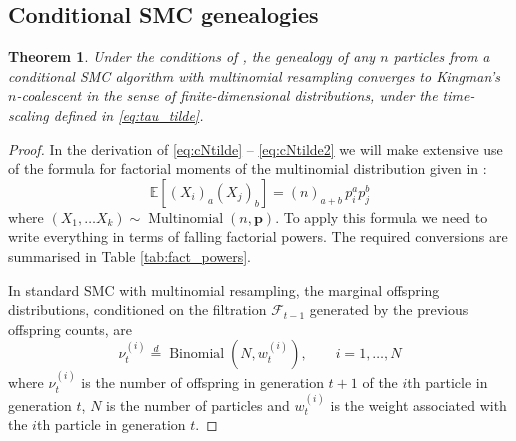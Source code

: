 \documentclass[fleqn]{article}
\newtheorem{thm}{Theorem}
\theoremstyle{definition}
\newcommand{\E}{\mathbb{E}}
\newcommand{\eqdist}{\overset{d}{=}}
\newcommand{\Mn}{\operatorname{Multinomial}}
\newcommand{\Bin}{\operatorname{Binomial}}
\newcommand{\F}{\mathcal{F}_{t-1}}
\newcommand{\vt}[2][t]{\nu_{#1}^{(#2)}}
\newcommand{\wt}[2][t]{w_{#1}^{(#2)}}
\begin{document}
\subsection{Conditional SMC genealogies}
\begin{thm}
Under the conditions of \citet[Lemma 3]{koskela2018}, the genealogy of any $n$ particles from a conditional SMC algorithm with multinomial resampling converges to Kingman's $n$-coalescent in the sense of finite-dimensional distributions, under the time-scaling defined in \eqref{eq:tau_tilde}.
\end{thm}

\begin{proof}
In the derivation of \eqref{eq:cNtilde} -- \eqref{eq:cNtilde2} we will make extensive use of the formula for factorial moments of the multinomial distribution given in \citet[p.67]{mosimann1962}:
\begin{equation} \label{eq:mn_moments}
\E[(X_i)_a(X_j)_b] = (n)_{a+b}\, p_i^a p_j^b
\end{equation}
where $(X_1,\dots X_k) \sim \Mn(n, \mathbf{p})$.
To apply this formula we need to write everything in terms of falling factorial powers. The required conversions are summarised in Table \ref{tab:fact_powers}.

In standard SMC with multinomial resampling, the marginal offspring distributions, conditioned on the filtration $\F$ generated by the previous offspring counts, are
\begin{equation*}
\vt{i} \eqdist \Bin (N, \wt{i}), \qquad i=1,\dots,N
\end{equation*}
where $\vt{i}$ is the number of offspring in generation $t+1$ of the $i$th particle in generation $t$, $N$ is the number of particles and $\wt{i}$ is the weight associated with the $i$th particle in generation $t$.


\end{proof}
\end{document}
